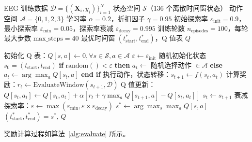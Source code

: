 \begin{algorithm}[H]
\caption{表格型 Q-Learning 时间窗优化算法}
\label{alg:qlearning}
\begin{algorithmic}[1]
\REQUIRE EEG 训练数据 $\mathcal{D} = \{(\mathbf{X}_i, y_i)\}_{i=1}^N$
\REQUIRE 状态空间 $\mathcal{S}$（136 个离散时间窗状态）
\REQUIRE 动作空间 $\mathcal{A} = \{0, 1, 2, 3\}$
\REQUIRE 学习率 $\alpha = 0.2$，折扣因子 $\gamma = 0.95$
\REQUIRE 初始探索率 $\varepsilon_{\text{init}} = 0.9$，最小探索率 $\varepsilon_{\text{min}} = 0.05$，探索率衰减 $\varepsilon_{\text{decay}} = 0.995$
\REQUIRE 训练轮数 $n_{\text{episodes}} = 100$，每轮最大步数 $\text{max\_steps} = 40$
\ENSURE 最优时间窗 $(t_{\text{start}}^*, t_{\text{end}}^*)$，Q 值表 $Q$

\STATE 初始化 Q 表：$Q[s, a] \leftarrow 0, \forall s \in \mathcal{S}, a \in \mathcal{A}$
\STATE $\varepsilon \leftarrow \varepsilon_{\text{init}}$
    \STATE 随机初始化状态 $s_0 = (t_{\text{start}}, t_{\text{end}})$
        \STATE \textbf{if} $\text{random}() < \varepsilon$ \textbf{then}
            \STATE $a_t \leftarrow$ 随机选择动作 $\in \mathcal{A}$
        \STATE \textbf{else}
            \STATE $a_t \leftarrow \arg\max_a Q[s_t, a]$
        \STATE \textbf{end if}
        \STATE 执行动作，状态转移：$s_{t+1} \leftarrow f(s_t, a_t)$
        \STATE 计算奖励：$r_t \leftarrow \text{EvaluateWindow}(s_{t+1}, \mathcal{D})$
        \STATE Q 值更新：$Q[s_t, a_t] \leftarrow Q[s_t, a_t] + \alpha[r_t + \gamma\max_a Q[s_{t+1}, a] - Q[s_t, a_t]]$
        \STATE $s_t \leftarrow s_{t+1}$
    \ENDFOR
    \STATE 衰减探索率：$\varepsilon \leftarrow \max(\varepsilon_{\text{min}}, \varepsilon \times \varepsilon_{\text{decay}})$
\ENDFOR
\STATE $s^* \leftarrow \arg\max_s \max_a Q[s, a]$
\STATE \RETURN $(t_{\text{start}}^*, t_{\text{end}}^*) = s^*$, $Q$
\end{algorithmic}
\end{algorithm}

奖励计算过程如算法~\ref{alg:evaluate} 所示。

